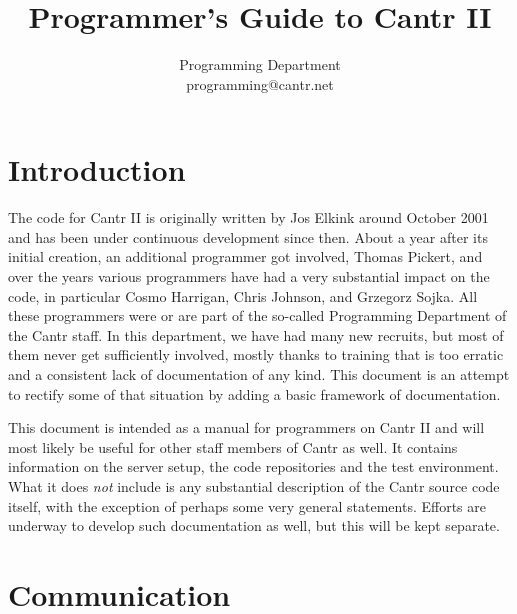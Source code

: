 \documentclass[a4paper,12pt]{article}
\begin{document}
\title{Programmer's Guide to Cantr II}
\author{Programming Department\\programming@cantr.net}
\maketitle

\tableofcontents

\section{Introduction}

The code for Cantr II is originally written by Jos Elkink around October 2001 and has been under continuous development since then. About a year after its initial creation, an additional programmer got involved, Thomas Pickert, and over the years various programmers have had a very substantial impact on the code, in particular Cosmo Harrigan, Chris Johnson, and Grzegorz Sojka. All these programmers were or are part of the so-called Programming Department of the Cantr staff. In this department, we have had many new recruits, but most of them never get sufficiently involved, mostly thanks to training that is too erratic and a consistent lack of documentation of any kind. This document is an attempt to rectify some of that situation by adding a basic framework of documentation.

This document is intended as a manual for programmers on Cantr II and will most likely be useful for other staff members of Cantr as well. It contains information on the server setup, the code repositories and the test environment. What it does {\it not} include is any substantial description of the Cantr source code itself, with the exception of perhaps some very general statements. Efforts are underway to develop such documentation as well, but this will be kept separate.

\section{Communication}
\end{document}
